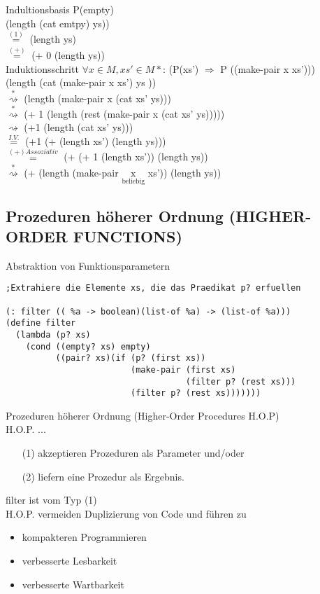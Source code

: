 \documentclass[a4paper,12pt]{article}
\begin{document}
Indultionsbasis P(empty) \\
(length (cat emtpy) ys)) \\
$\overset{(1)}{=}$ (length ys) \\
$\overset{(+)}{=}$ (+ 0 (length ys)) \checkmark \\

Induktionsschritt $\forall x \in M, xs' \in M*$: (P(xs') $\Rightarrow$ P ((make-pair x xs')))\\
(length (cat (make-pair x xs') ys )) \\
$\overset{*}{\rightsquigarrow}$ (length (make-pair x (cat xs' ys))) \\
$\overset{*}{\rightsquigarrow}$ (+ 1 (length (rest (make-pair x (cat xs' ys))))) \\
$\rightsquigarrow$ (+1 (length (cat xs' ys))) \\
$\overset{I.V.}{=}$ (+1 (+ (length xs') (length ys))) \\
$\overset{(+) Assoziativ}{=}$ (+ (+ 1 (length xs')) (length ys)) \\
$\overset{*}{\rightsquigarrow}$ (+ (length (make-pair $\underset{\text{beliebig}}{\text{x}}$ xs')) (length ys))  \checkmark \\

\subsection{Prozeduren höherer Ordnung (HIGHER-ORDER FUNCTIONS)}
Abstraktion von Funktionsparametern
\begin{lstlisting}[style=customc]
;Extrahiere die Elemente xs, die das Praedikat p? erfuellen

(: filter (( %a -> boolean)(list-of %a) -> (list-of %a)))
(define filter
  (lambda (p? xs)
    (cond ((empty? xs) empty)
          ((pair? xs)(if (p? (first xs))
                         (make-pair (first xs)
                                    (filter p? (rest xs)))
                         (filter p? (rest xs)))))))
\end{lstlisting}
\newpage

Prozeduren höherer Ordnung (Higher-Order Procedures H.O.P)\\
H.O.P. ...
\begin{itemize}
\item[(1)] akzeptieren Prozeduren als Parameter und/oder
\item[(2)] liefern eine Prozedur als Ergebnis.
\end{itemize}
filter ist vom Typ (1)\\
H.O.P. vermeiden Duplizierung von Code und führen zu
\begin{itemize}
\item kompakteren Programmieren
\item verbesserte Lesbarkeit
\item verbesserte Wartbarkeit
\end{itemize}
\end{document}
